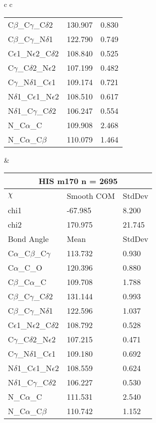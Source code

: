 \begin{longtable}{ c c }
\begin{tabular}{ l l l }
  C$\beta$\_C$\gamma$\_C$\delta$2 & 130.907 & 0.830\\
  C$\beta$\_C$\gamma$\_N$\delta$1 & 122.790 & 0.749\\
  C$\epsilon$1\_N$\epsilon$2\_C$\delta$2 & 108.840 & 0.525\\
  C$\gamma$\_C$\delta$2\_N$\epsilon$2 & 107.199 & 0.482\\
  C$\gamma$\_N$\delta$1\_C$\epsilon$1 & 109.174 & 0.721\\
  N$\delta$1\_C$\epsilon$1\_N$\epsilon$2 & 108.510 & 0.617\\
  N$\delta$1\_C$\gamma$\_C$\delta$2 & 106.247 & 0.554\\
  N\_C$\alpha$\_C & 109.908 & 2.468\\
  N\_C$\alpha$\_C$\beta$ & 110.079 & 1.464\\
  \bottomrule
  \end{tabular}
  &
  \begin{tabular}{ l l l }
  \toprule
  \multicolumn{3}{c}{HIS \textbf{m170} n = 2695} \\ \toprule
  $\chi$       & Smooth COM & StdDev \\ \midrule
  chi1 & -67.985 & 8.200 \\ 
  chi2 & 170.975 & 21.745 \\ \midrule
  Bond Angle   & Mean     & StdDev \\ \midrule
  C$\alpha$\_C$\beta$\_C$\gamma$ & 113.732 & 0.930\\
  C$\alpha$\_C\_O & 120.396 & 0.880\\
  C$\beta$\_C$\alpha$\_C & 109.708 & 1.788\\
  C$\beta$\_C$\gamma$\_C$\delta$2 & 131.144 & 0.993\\
  C$\beta$\_C$\gamma$\_N$\delta$1 & 122.596 & 1.037\\
  C$\epsilon$1\_N$\epsilon$2\_C$\delta$2 & 108.792 & 0.528\\
  C$\gamma$\_C$\delta$2\_N$\epsilon$2 & 107.215 & 0.471\\
  C$\gamma$\_N$\delta$1\_C$\epsilon$1 & 109.180 & 0.692\\
  N$\delta$1\_C$\epsilon$1\_N$\epsilon$2 & 108.559 & 0.624\\
  N$\delta$1\_C$\gamma$\_C$\delta$2 & 106.227 & 0.530\\
  N\_C$\alpha$\_C & 111.531 & 2.540\\
  N\_C$\alpha$\_C$\beta$ & 110.742 & 1.152\\
  \bottomrule
  \end{tabular}
  \\

\end{longtable}
